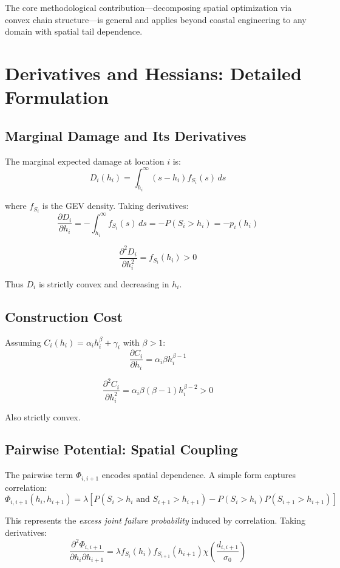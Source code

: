 \documentclass[12pt]{article}
\theoremstyle{definition}
\begin{document}
The core methodological contribution---decomposing spatial optimization via convex chain structure---is general and applies beyond coastal engineering to any domain with spatial tail dependence.

\clearpage
\appendix

\section{Derivatives and Hessians: Detailed Formulation}

\subsection{Marginal Damage and Its Derivatives}

The marginal expected damage at location $i$ is:
\[
D_i(h_i) = \int_{h_i}^\infty (s - h_i) f_{S_i}(s) \, ds
\]

where $f_{S_i}$ is the GEV density. Taking derivatives:
\[
\frac{\partial D_i}{\partial h_i} = -\int_{h_i}^\infty f_{S_i}(s) \, ds = -P(S_i > h_i) = -p_i(h_i)
\]

\[
\frac{\partial^2 D_i}{\partial h_i^2} = f_{S_i}(h_i) > 0
\]

Thus $D_i$ is strictly convex and decreasing in $h_i$.

\subsection{Construction Cost}

Assuming $C_i(h_i) = \alpha_i h_i^\beta + \gamma_i$ with $\beta > 1$:
\[
\frac{\partial C_i}{\partial h_i} = \alpha_i \beta h_i^{\beta-1}
\]

\[
\frac{\partial^2 C_i}{\partial h_i^2} = \alpha_i \beta(\beta-1) h_i^{\beta-2} > 0
\]

Also strictly convex.

\subsection{Pairwise Potential: Spatial Coupling}

The pairwise term $\Phi_{i,i+1}$ encodes spatial dependence. A simple form captures correlation:
\[
\Phi_{i,i+1}(h_i, h_{i+1}) = \lambda \left[ P(S_i > h_i \text{ and } S_{i+1} > h_{i+1}) - P(S_i > h_i) P(S_{i+1} > h_{i+1}) \right]
\]

This represents the \emph{excess joint failure probability} induced by correlation. Taking derivatives:
\[
\frac{\partial^2 \Phi_{i,i+1}}{\partial h_i \partial h_{i+1}} = \lambda f_{S_i}(h_i) f_{S_{i+1}}(h_{i+1}) \chi\left( \frac{d_{i,i+1}}{\sigma_0} \right)
\]
\end{document}
